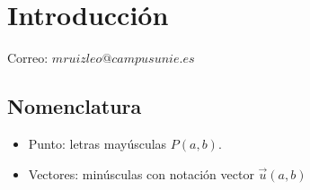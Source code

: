 \documentclass{../Geometria.tex}
\begin{document}
\chapter{Introducción}
Correo: $mruizleo@campusunie.es$\\
\section{Nomenclatura}
\begin{itemize}
	\item Punto: letras mayúsculas $P(a,b)$.
	\item Vectores: minúsculas con notación vector $\vec{u}(a,b)$ 
\end{itemize}
\end{document}
